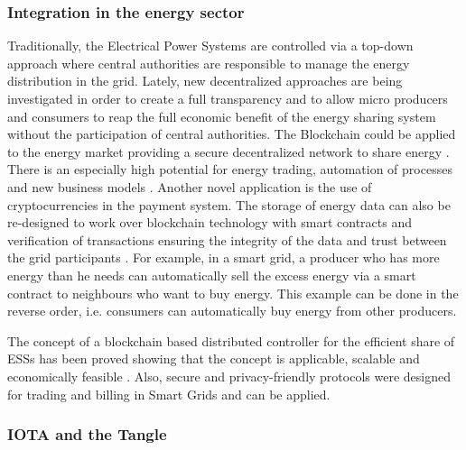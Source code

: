 \subsubsection{Integration in the energy sector}

Traditionally, the Electrical Power Systems are controlled via a top-down approach where central authorities are responsible to manage the energy distribution in the grid. Lately, new decentralized approaches are being investigated in order to create a full transparency and to allow micro producers and consumers to reap the full economic benefit of the energy sharing system without the participation of central authorities. The Blockchain could be applied to the energy market providing a secure decentralized network to share energy \cite{Hasse2016}. There is an especially high potential for energy trading, automation of processes and new business models \cite{UseCasesforBlockchainTechnologyinEnergyCommodityTrading}. Another novel application is the use of cryptocurrencies in the payment system. The storage of energy data can also be re-designed to work over blockchain technology with smart contracts and verification of transactions ensuring the integrity of the data and trust between the grid participants \cite{ETHome:Opensourceblockchainbasedenergycommunitycontroller}. For example, in a smart grid, a producer who has more energy than he needs can automatically sell the excess energy via a smart contract to neighbours who want to buy energy. This example can be done in the reverse order, i.e. consumers can automatically buy energy from other producers.


 The concept of a blockchain based distributed controller for the efficient share of \acp{ESS}  has been proved showing that the concept is applicable, scalable and economically feasible \cite{ETHome:Opensourceblockchainbasedenergycommunitycontroller}. Also, secure and privacy-friendly protocols were designed for trading and billing in Smart Grids \cite{SecureandPrivacy-FriendlyLocalElectricityTradingandBillinginSmartGrid} and can be applied. 

\subsubsection{IOTA and the Tangle}
\label{seciotatech}


